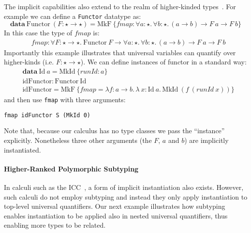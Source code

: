 The implicit capabilities also extend to the realm of higher-kinded types~\cite{}. For example
we can define a \verb|Functor| datatype as:
\newcommand{\Functor}[0]{\mathrm{Functor}}
\newcommand{\MkFunctor}[0]{\mathrm{MkF}}
\newcommand{\Id}[0]{\mathrm{Id}}
\newcommand{\MkId}[0]{\mathrm{MkId}}
\begin{equation*}
  \mathbf{data}~\Functor~(F : \star \rightarrow \star) = \MkFunctor~\{fmap : \forall a : \star.\, \forall b : \star.\, (a \rightarrow b) \rightarrow F~a \rightarrow F~b\}
\end{equation*}
In this case the type of $fmap$ is:
\begin{align*}
  & fmap : \forall F : \star \to \star.~\Functor~F \to \forall a : \star.\, \forall b : \star.\, (a \rightarrow b) \rightarrow F~a \rightarrow F~b 
\end{align*}
Importantly this example illustrates that universal variables can quantify over higher-kinds (i.e.
$F : \star \to \star$).
We can define instances of functor in a standard way:
\begin{align*}
  & \mathbf{data}~\mathrm{Id}~a=\mathrm{MkId}~\{runId : a\} \\
  & \mathrm{idFunctor} : \Functor~\Id \\
  & \mathrm{idFunctor} = \MkFunctor~\{fmap = \lambda f : a \rightarrow b.\, \lambda ~x : \Id~a.\, \MkId~(f~(runId~x))\}
\end{align*}
and then use \verb|fmap| with three arguments:

\begin{verbatim}
fmap idFunctor S (MkId 0)
\end{verbatim}

\noindent Note that, because our calculus has no type classes we pass the ``instance'' explicitly.
Nonetheless three other arguments (the $F$, $a$ and $b$) are implicitly instantiated.

\paragraph{Higher-Ranked Polymorphic Subtyping}
\label{sec:higher-ranked-poly}

In calculi such as the ICC~\cite{}, a form of implicit instantiation also exists.
However, such calculi do not employ subtyping and instead they only apply instantiation
to top-level universal quantifiers. Our next example illustrates how subtyping enables
instantiation to be applied also in nested universal quantifiers, thus enabling
more types to be related.


